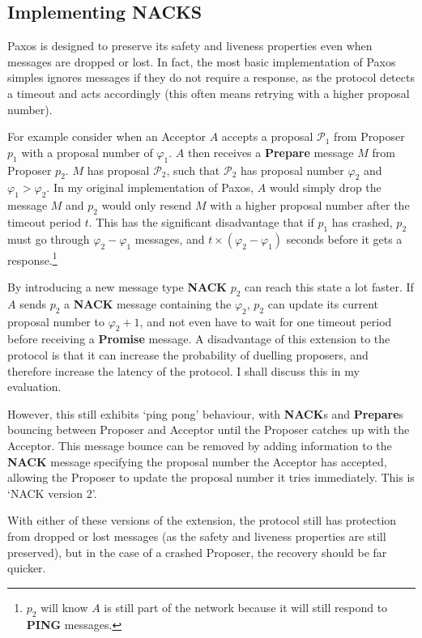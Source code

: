 \documentclass[12pt,twoside,notitlepage]{report}
\newcommand{\msg}[1] {{\bf #1}}         %
\begin{document}
\subsection{Implementing NACKS}

\label{sec:nacks}

Paxos is designed to preserve its safety and liveness properties even when messages are dropped or
lost. In fact, the most basic implementation of Paxos simples ignores messages if they do not
require a response, as the protocol detects a timeout and acts accordingly (this often means
retrying with a higher proposal number).

For example consider when an Acceptor $A$ accepts a proposal $\mathcal{P}_1$ from Proposer $p_1$
with a proposal number of $\varphi_1$. $A$ then receives a \msg{Prepare} message $M$ from Proposer
$p_2$. $M$ has proposal $\mathcal{P}_2$, such that $\mathcal{P}_2$ has proposal number $\varphi_2$
and $\varphi_1 > \varphi_2$. In my original implementation of Paxos, $A$ would simply drop the
message $M$ and $p_2$ would only resend $M$ with a higher proposal number after the timeout period
$t$.  This has the significant disadvantage that if $p_1$ has crashed, $p_2$ must go through
$\varphi_2 - \varphi_1$ messages, and $t\times (\varphi_2 - \varphi_1)$ seconds before it gets a
response.\footnote{$p_2$ will know $A$ is still part of the network because it will still respond
to \msg{PING} messages.}

By introducing a new message type \msg{NACK} $p_2$ can reach this state a lot faster. If $A$ sends
$p_2$ a \msg{NACK} message containing the $\varphi_2$, $p_2$ can update its current proposal
number to $\varphi_2 + 1$, and not even have to wait for one timeout period before receiving a
\msg{Promise} message. A disadvantage of this extension to the protocol is that it can increase
the probability of duelling proposers, and therefore increase the latency of the protocol. I shall
discuss this in my evaluation.

However, this still exhibits `ping pong' behaviour, with \msg{NACK}s and \msg{Prepare}s bouncing
between Proposer and Acceptor until the Proposer catches up with the Acceptor. This message bounce
can be removed by adding information to the \msg{NACK} message specifying the proposal number the
Acceptor has accepted, allowing the Proposer to update the proposal number it tries immediately.
This is `NACK version 2'.

With either of these versions of the extension, the protocol still has protection from dropped or
lost messages (as the safety and liveness properties are still preserved), but in the case of a
crashed Proposer, the recovery should be far quicker.
\end{document}
